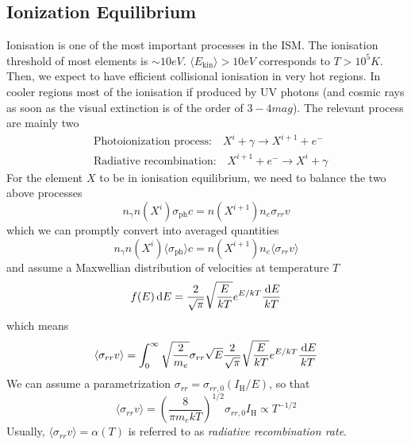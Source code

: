 \subsection{Ionization Equilibrium}

Ionisation is one of the most important processes in the ISM. The ionisation threshold of most elements is $\sim 10 \unit{eV}$. $\langle E_{\text{kin}} \rangle > 10\unit{eV}$ corresponds to $T > 10^{5}\unit{K}$. Then, we expect to have eﬃcient collisional ionisation in very hot regions. In cooler regions most of the ionisation if
produced by UV photons (and cosmic rays as soon as the visual extinction is of the order of $3-4 \unit{mag}$). The relevant process are mainly two 
\begin{align*}
    & \text{Photoionization process:} \quad X^{i}+\gamma \to X^{i+1}+e^{-}\\
    & \text{Radiative recombination:} \quad X^{i+1}+e^{-} \to X^{i}+\gamma
\end{align*}
For the element $X$ to be in ionisation equilibrium, we need to balance the two above processes
\begin{equation*}
    n_{\gamma}n(X^{i})\sigma_{\text{ph}} c = n(X^{i+1})n_{e}\sigma_{rr}v
\end{equation*}
which we can promptly convert into averaged quantities 
\begin{equation*}
    n_{\gamma}n(X^{i})\langle \sigma_{\text{ph}}\rangle c = n(X^{i+1})n_{e}\langle \sigma_{rr}v\rangle
\end{equation*}
and assume a Maxwellian distribution of velocities at temperature $T$
\begin{equation*}
    f(E)\,\text{d}E = \frac{2}{\sqrt{\pi}}\sqrt{\frac{E}{kT}}e^{E/kT}\frac{\,\text{d}E}{kT}
\end{equation*}
which means 
\begin{equation*}
    \langle \sigma_{rr}v\rangle = \int_{0}^{\infty} \sqrt{\frac{2}{m_{e}}}\sigma_{rr}\sqrt{E}\frac{2}{\sqrt{\pi}}\sqrt{\frac{E}{kT}}e^{E/kT}\frac{\,\text{d}E}{kT}
\end{equation*}
We can assume a parametrization $\sigma_{rr} = \sigma_{rr,0}(I_{\text{H}}/E)$, so that 
\begin{equation}
    \langle \sigma_{rr}v\rangle = \left(\frac{8}{\pi m_{e}kT}\right)^{1/2}\sigma_{rr,0}I_{\text{H}}\propto T^{-1/2}
    \label{eq:rrrate}
\end{equation}
Usually, $\langle \sigma_{rr}v\rangle = \alpha(T)$ is referred to as \emph{radiative recombination rate}.


